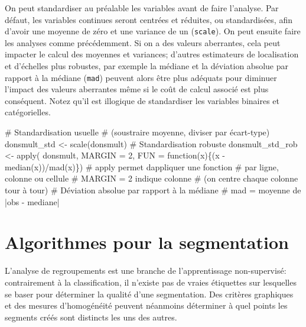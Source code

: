 \documentclass[
  11pt,
  letterpaper,
]{scrbook}
\newenvironment{Shaded}{\begin{snugshade}}{\end{snugshade}}
\newcommand{\AttributeTok}[1]{\textcolor[rgb]{0.40,0.45,0.13}{#1}}
\newcommand{\CommentTok}[1]{\textcolor[rgb]{0.37,0.37,0.37}{#1}}
\newcommand{\ControlFlowTok}[1]{\textcolor[rgb]{0.00,0.23,0.31}{#1}}
\newcommand{\DecValTok}[1]{\textcolor[rgb]{0.68,0.00,0.00}{#1}}
\newcommand{\FunctionTok}[1]{\textcolor[rgb]{0.28,0.35,0.67}{#1}}
\newcommand{\NormalTok}[1]{\textcolor[rgb]{0.00,0.23,0.31}{#1}}
\newcommand{\OtherTok}[1]{\textcolor[rgb]{0.00,0.23,0.31}{#1}}
\newcommand{\SpecialCharTok}[1]{\textcolor[rgb]{0.37,0.37,0.37}{#1}}
\theoremstyle{definition}
\theoremstyle{remark}
\begin{document}
On peut standardiser au préalable les variables avant de faire
l'analyse. Par défaut, les variables continues seront centrées et
réduites, ou standardisées, afin d'avoir une moyenne de zéro et une
variance de un (\texttt{scale}). On peut ensuite faire les analyses
comme précédemment. Si on a des valeurs aberrantes, cela peut impacter
le calcul des moyennes et variances; d'autres estimateurs de
localisation et d'échelles plus robustes, par exemple la médiane et la
déviation absolue par rapport à la médiane (\texttt{mad}) peuvent alors
être plus adéquats pour diminuer l'impact des valeurs aberrantes même si
le coût de calcul associé est plus conséquent. Notez qu'il est illogique
de standardiser les variables binaires et catégorielles.

\begin{Shaded}
\begin{Highlighting}[]
\CommentTok{\# Standardisation usuelle }
\CommentTok{\# (soustraire moyenne, diviser par écart{-}type)}
\NormalTok{donsmult\_std }\OtherTok{\textless{}{-}} \FunctionTok{scale}\NormalTok{(donsmult)}
\CommentTok{\# Standardisation robuste}
\NormalTok{donsmult\_std\_rob }\OtherTok{\textless{}{-}} \FunctionTok{apply}\NormalTok{(}
\NormalTok{  donsmult, }
  \AttributeTok{MARGIN =} \DecValTok{2}\NormalTok{, }
  \AttributeTok{FUN =} \ControlFlowTok{function}\NormalTok{(x)\{(x }\SpecialCharTok{{-}} \FunctionTok{median}\NormalTok{(x))}\SpecialCharTok{/}\FunctionTok{mad}\NormalTok{(x)\})}
\CommentTok{\# apply permet d\textquotesingle{}appliquer une fonction}
\CommentTok{\# par ligne, colonne ou cellule}
\CommentTok{\# MARGIN = 2 indique colonne }
\CommentTok{\# (on centre chaque colonne tour à tour)}
\CommentTok{\# Déviation absolue par rapport à la médiane}
\CommentTok{\# mad = moyenne de |obs {-} mediane|}
\end{Highlighting}
\end{Shaded}

\hypertarget{algorithmes-pour-la-segmentation}{%
\section{Algorithmes pour la
segmentation}\label{algorithmes-pour-la-segmentation}}

L'analyse de regroupements est une branche de l'apprentissage
non-supervisé: contrairement à la classification, il n'existe pas de
vraies étiquettes sur lesquelles se baser pour déterminer la qualité
d'une segmentation. Des critères graphiques et des mesures d'homogénéité
peuvent néanmoins déterminer à quel points les segments créés sont
distincts les uns des autres.
\end{document}

